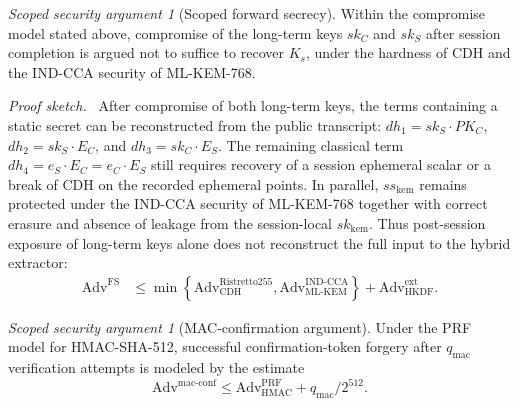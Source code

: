 \documentclass[preprint,12pt]{elsarticle}
\theoremstyle{remark}
\newtheorem{claim}[theorem]{Scoped security argument}
\newenvironment{sketchproof}{\par\noindent\textit{Proof sketch.}\ }{\par}
\begin{document}
\begin{claim}[Scoped forward secrecy]
Within the compromise model stated above, compromise of the long-term
keys $sk_C$ and $sk_S$ after session completion is argued not to suffice
to recover $K_s$, under the hardness of CDH and the IND-CCA security of
ML-KEM-768.
\end{claim}

\begin{sketchproof}
After compromise of both long-term keys, the terms containing a static
secret can be reconstructed from the public transcript:
$dh_1 = sk_S \cdot PK_C$, $dh_2 = sk_S \cdot E_C$, and
$dh_3 = sk_C \cdot E_S$. The remaining classical term
$dh_4 = e_S \cdot E_C = e_C \cdot E_S$ still requires recovery of a
session ephemeral scalar or a break of CDH on the recorded ephemeral
points. In parallel, $ss_{\mathrm{kem}}$ remains protected under the
IND-CCA security of ML-KEM-768 together with correct erasure and absence
of leakage from the session-local $sk_{\mathrm{kem}}$. Thus
post-session exposure of long-term keys alone does not reconstruct the
full input to the hybrid extractor:
\begin{equation}
  \label{eq:fs-advantage-bound}
  \begin{aligned}
    \mathrm{Adv}^{\mathrm{FS}}
    &\leq
    \min\!\left\{
      \mathrm{Adv}_{\mathrm{CDH}}^{\mathrm{Ristretto255}},
      \mathrm{Adv}_{\mathrm{ML\text{-}KEM}}^{\mathrm{IND\text{-}CCA}}
    \right\}
    + \mathrm{Adv}_{\mathrm{HKDF}}^{\mathrm{ext}}.
  \end{aligned}
\end{equation}
\end{sketchproof}

\begin{claim}[MAC-confirmation argument]
Under the PRF model for HMAC-SHA-512, successful confirmation-token
forgery after $q_{\mathrm{mac}}$ verification attempts is modeled by the
estimate
\[
  \mathrm{Adv}^{\mathrm{mac\text{-}conf}} \leq
  \mathrm{Adv}_{\mathrm{HMAC}}^{\mathrm{PRF}} +
  q_{\mathrm{mac}} / 2^{512}.
\]
\end{claim}
\end{document}

